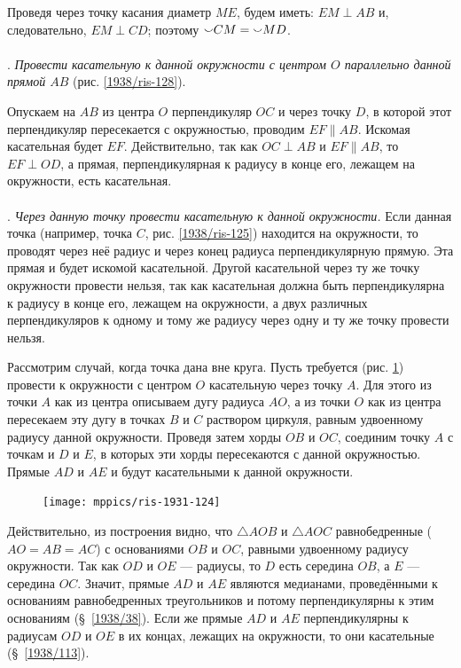 \documentclass[twoside]{book}
\begin{document}
Проведя через точку касания диаметр $ME$, будем иметь:
$EM\perp AB$ и, следовательно, $EM\perp CD$;
поэтому ${\smallsmile}CM\z={\smallsmile}MD$.

\paragraph{}\label{1938/115}
\mbox{.}
\emph{Провести касательную к данной окружности с центром $O$ параллельно данной прямой $AB$} (рис. \ref{1938/ris-128}).

Опускаем на $AB$ из центра $O$ перпендикуляр $OC$ и через точку $D$, в которой этот перпендикуляр пересекается с окружностью, проводим $EF\parallel AB$.
Искомая касательная будет $EF$.
Действительно, так как $OC\perp AB$ и $EF\parallel AB$, то $EF\perp OD$, а прямая, перпендикулярная к радиусу в конце его, лежащем на окружности, есть касательная.

\paragraph{}\label{1931/115}
\mbox{.}
\emph{Через данную точку провести касательную к данной окружности.}
Если данная точка (например, точка $C$, рис. \ref{1938/ris-125}) находится на окружности, то проводят через неё радиус и через конец радиуса перпендикулярную прямую.
Эта прямая и будет искомой касательной.
Другой касательной через ту же точку окружности провести нельзя, так как касательная должна быть перпендикулярна к радиусу в конце его, лежащем на окружности, а двух различных перпендикуляров к одному и тому же радиусу через одну и ту же точку провести нельзя.

Рассмотрим случай, когда точка дана вне круга.
Пусть требуется (рис. \ref{1931/ris-124}) провести к окружности с центром $O$ касательную через точку $A$.
Для этого из точки $A$ как из центра описываем дугу радиуса $AO$, а из точки $O$ как из центра пересекаем эту дугу в точках $B$ и $C$ раствором циркуля, равным удвоенному радиусу данной окружности.
Проведя затем хорды $OB$ и $OC$, соединим точку $A$ с точкам и $D$ и $E$, в которых эти хорды пересекаются с
данной окружностью.
Прямые $AD$ и $AE$ и будут касательными к данной окружности.

\begin{figure}
\centering
\texttt{[image: mppics/ris-1931-124]}
\caption{}\label{1931/ris-124}
\end{figure}

Действительно, из построения видно, что $\triangle AOB$ и $\triangle AOC$ равнобедренные ($AO=AB=AC$) с основаниями $OB$ и $OC$, равными удвоенному радиусу окружности.
Так как $OD$ и $OE$ --- радиусы, то $D$ есть середина $OB$, а $E$ --- середина $OC$.
Значит, прямые $AD$ и $AE$ являются медианами, проведёнными к основаниям равнобедренных треугольников и потому перпендикулярны к этим основаниям (§~\ref{1938/38}).
Если же прямые $AD$ и $AE$ перпендикулярны к радиусам $OD$ и $OE$ в их концах, лежащих
на окружности, то они касательные (§~\ref{1938/113}).
\end{document}
